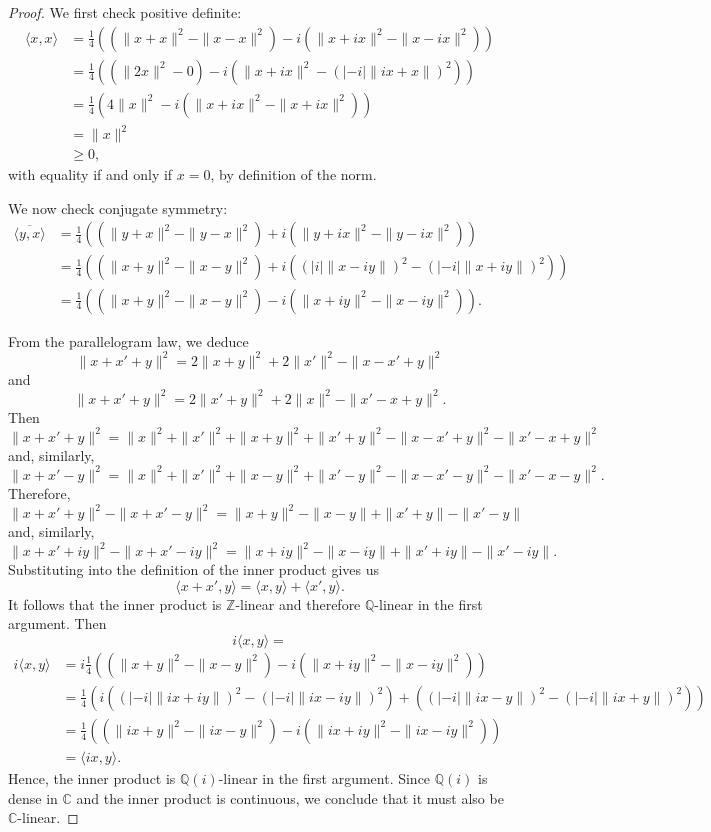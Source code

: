 \documentclass[12pt]{article}
\theoremstyle{definition}
\newcommand{\Z}{\mathbb{Z}}
\newcommand{\Q}{\mathbb{Q}}
\newcommand{\C}{\mathbb{C}}
\newcommand{\<}{\langle}
\renewcommand{\>}{\rangle}
\begin{document}
\begin{proof}
    We first check positive definite:
    \begin{align*}
        \<x, x\>
            &= \frac{1}{4}\left((\|x + x\|^2 - \|x - x\|^2) - i(\|x + ix\|^2 - \|x - ix\|^2)\right) \\
            &= \frac{1}{4}\left((\|2x\|^2 - 0) - i(\|x + ix\|^2 - (|-i|\|ix + x\|)^2)\right) \\
            &= \frac{1}{4}\left(4\|x\|^2 - i(\|x + ix\|^2 - \|x + ix\|^2)\right) \\
            &= \|x\|^2 \\
            &\geq 0,
    \end{align*}
    with equality if and only if $x = 0$, by definition of the norm.

    We now check conjugate symmetry:
    \begin{align*}
        \overline{\<y, x\>}
            &= \frac{1}{4}\left((\|y + x\|^2 - \|y - x\|^2) + i(\|y + ix\|^2 - \|y - ix\|^2)\right) \\
            &= \frac{1}{4}\left((\|x + y\|^2 - \|x - y\|^2) + i((|i|\|x - iy\|)^2 - (|-i|\|x + iy\|)^2)\right) \\
            &= \frac{1}{4}\left((\|x + y\|^2 - \|x - y\|^2) - i(\|x + iy\|^2 - \|x - iy\|^2)\right).
    \end{align*}
    
    From the parallelogram law, we deduce
    \[
        \|x + x' + y\|^2 = 2\|x + y\|^2 + 2\|x'\|^2 - \|x - x' + y\|^2
    \]
    and
    \[
        \|x + x' + y\|^2 = 2\|x' + y\|^2 + 2\|x\|^2 - \|x' - x + y\|^2.
    \]
    Then
    \[
        \|x + x' + y\|^2 = \|x\|^2 + \|x'\|^2 + \|x + y\|^2 + \|x' + y\|^2 - \|x - x' + y\|^2 - \|x' - x + y\|^2
    \]
    and, similarly,
    \[
        \|x + x' - y\|^2 = \|x\|^2 + \|x'\|^2 + \|x - y\|^2 + \|x' - y\|^2 - \|x - x' - y\|^2 - \|x' - x - y\|^2.
    \]
    Therefore,
    \[
        \|x + x' + y\|^2 - \|x + x' - y\|^2
            = \|x + y\|^2 - \|x - y\| + \|x' + y\| - \|x' - y\|
    \]
    and, similarly,
    \[
        \|x + x' + iy\|^2 - \|x + x' - iy\|^2
            = \|x + iy\|^2 - \|x - iy\| + \|x' + iy\| - \|x' - iy\|.
    \]
    Substituting into the definition of the inner product gives us 
    \[
        \<x + x', y\> = \<x, y\> + \<x', y\>.
    \]
    It follows that the inner product is $\Z$-linear and therefore $\Q$-linear in the first argument.
    Then
    \[
        i\<x, y\> = 
    \]
    \begin{align*}
        i\<x, y\>
            &= i\frac{1}{4}\left((\|x + y\|^2 - \|x - y\|^2) - i(\|x + iy\|^2 - \|x - iy\|^2)\right) \\
            &= \frac{1}{4}\left(i((|-i|\|ix + iy\|)^2 - (|-i|\|ix - iy\|)^2) + ((|-i|\|ix - y\|)^2 - (|-i|\|ix + y\|)^2)\right) \\
            &= \frac{1}{4}\left((\|ix + y\|^2 - \|ix - y\|^2) - i(\|ix + iy\|^2 - \|ix - iy\|^2)\right) \\
            &= \<ix, y\>.
    \end{align*}
    Hence, the inner product is $\Q(i)$-linear in the first argument.
    Since $\Q(i)$ is dense in $\C$ and the inner product is continuous, we conclude that it must also be $\C$-linear.
\end{proof}
\end{document}
